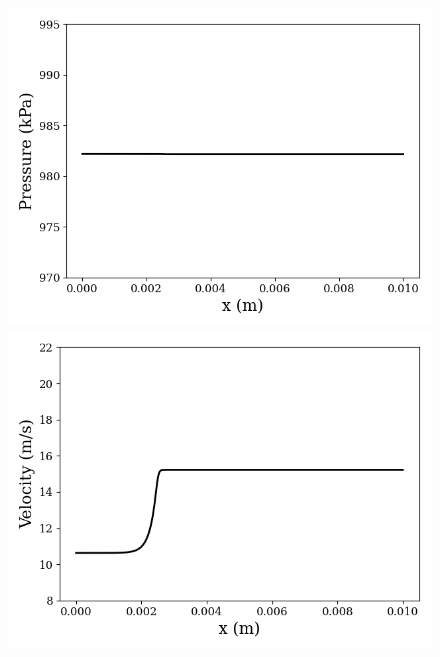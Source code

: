 \begin{figure}
	\begin{minipage}{0.49\linewidth}
		\includegraphics[width=0.99\linewidth]{Chapters/TransientFlame/Images/init_cond_pressure.png}
	\end{minipage}
	\begin{minipage}{0.49\linewidth}
		\includegraphics[width=0.99\linewidth]{Chapters/TransientFlame/Images/init_cond_vel.png}
	\end{minipage}


\end{figure}
